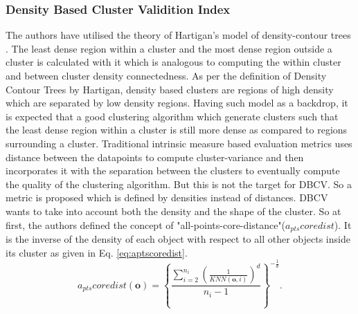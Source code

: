 \subsubsection*{Density Based Cluster Validition Index}
\label{sec:dbcv}
The authors have utilised the theory of Hartigan's model of density-contour trees \cite{hartigan1975clustering}. The least dense region within a cluster and the most dense region outside a cluster is calculated with it which is analogous to computing the within cluster and between cluster density connectedness. As per the definition of Density Contour Trees \cite{hartigan1975clustering} by Hartigan, density based clusters are regions of high density which are separated by low density regions. Having such model as a backdrop, it is expected that a good clustering algorithm which generate clusters such that the least dense region within a cluster is still more dense as compared to regions surrounding a cluster. Traditional intrinsic measure based evaluation metrics uses distance between the datapoints to compute cluster-variance and then incorporates it with the separation between the clusters to eventually compute the quality of the clustering algorithm. But this is not the target for \ac{DBCV}. So a metric is proposed which is defined by densities instead of distances. \ac{DBCV} wants to take into account both the density and the shape of the cluster. So at first, the authors defined the concept of "all-points-core-distance"($a_{pts}coredist$). It is the inverse of the density of each object with respect to all other objects inside its cluster as given in Eq. \ref{eq:aptscoredist}.
\begin{equation}
  \label{eq:aptscoredist}
  \mathit{a_{pts}coredist(\textbf{o})}= \mathit{\left\{\frac{\sum_{i=2}^{n_i}\left(\frac{1}{KNN(\textbf{o},i)}\right)^d}{n_i - 1}\right\}^{-\frac{1}{d}}}.
\end{equation}
